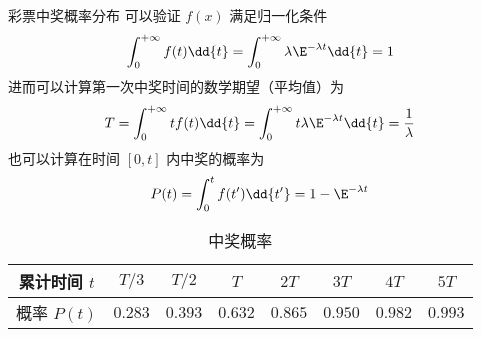 \begin{example}{彩票中奖概率分布}
可以验证 $f(x)$ 满足归一化条件
\begin{equation}
\int_0^{+\infty} f(t) \dd{t} = \int_0^{+\infty} \lambda\E^{-\lambda t} \dd{t} = 1
\end{equation}
进而可以计算第一次中奖时间的数学期望（平均值）为
\begin{equation}
T = \int_0^{+\infty} t f(t) \dd{t} = \int_0^{+\infty}t \lambda\E^{-\lambda t} \dd{t} = \frac{1}{\lambda}
\end{equation}
也可以计算在时间 $[0, t]$ 内中奖的概率为
\begin{equation}
P(t) = \int_0^{t} f(t') \dd{t'} = 1 - \E^{-\lambda t}
\end{equation}
\begin{table}[ht]
\centering
\caption{中奖概率}\label{RandF_tab2}
\begin{tabular}{|c|c|c|c|c|c|c|c|}
\hline
累计时间 $t$ & $T/3$  & $T/2$  & $T$     & $2T$ &     $3T$   &  $4T$   & $5T$\\
\hline
概率 $P(t)$ & $0.283$ & $0.393$ & $0.632$ & $0.865$ & $0.950$ & $0.982$ & $0.993$\\
\hline
\end{tabular}
\end{table}
\end{example}
